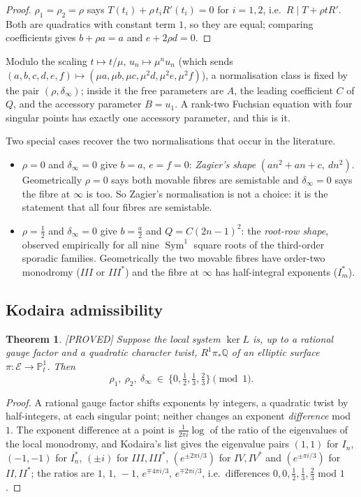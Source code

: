 \documentclass[11pt,reqno]{amsart}
\theoremstyle{plain}
\newtheorem{theorem}{Theorem}[section]
\theoremstyle{definition}
\theoremstyle{remark}
\theoremstyle{plain}
\newcommand{\Q}{\mathbb{Q}}
\newcommand{\PP}{\mathbb{P}}
\DeclareMathOperator{\Sym}{Sym}
\newcommand{\Proved}{\textup{\textsf{[PROVED]}}}
\begin{document}
\begin{proof}
$\rho_1=\rho_2=\rho$ says $T(t_i)+\rho\,t_iR'(t_i)=0$ for $i=1,2$, i.e.\
$R\mid T+\rho tR'$. Both are quadratics with constant term $1$, so they are
equal; comparing coefficients gives $b+\rho a=a$ and $e+2\rho d=0$.
\end{proof}

Modulo the scaling $t\mapsto t/\mu$, $u_n\mapsto\mu^nu_n$ (which sends
$(a,b,c,d,e,f)\mapsto(\mu a,\mu b,\mu c,\mu^2d,\mu^2e,\mu^2f)$), a normalisation
class is fixed by the pair $(\rho,\delta_\infty)$; inside it the free parameters
are $A$, the leading coefficient $C$ of $Q$, and the accessory parameter
$B=u_1$. A rank-two Fuchsian equation with four singular points has exactly one
accessory parameter, and this is it.

Two special cases recover the two normalisations that occur in the literature.

\begin{itemize}[leftmargin=1.6em]
\item $\rho=0$ and $\delta_\infty=0$ give $b=a$, $e=f=0$: \emph{Zagier's shape}
$(an^2+an+c,\ dn^2)$. Geometrically $\rho=0$ says both movable fibres are
semistable and $\delta_\infty=0$ says the fibre at $\infty$ is too. So Zagier's
normalisation is not a choice: it is the statement that all four fibres are
semistable.
\item $\rho=\tfrac12$ and $\delta_\infty=0$ give $b=\tfrac a2$ and
$Q=C(2n-1)^2$: the \emph{root-row shape}, observed empirically for all nine
$\Sym^1$ square roots of the third-order sporadic families. Geometrically the two
movable fibres have order-two monodromy ($III$ or $III^*$) and the fibre at
$\infty$ has half-integral exponents ($I_m^*$).
\end{itemize}

\subsection{Kodaira admissibility}

\begin{theorem}\label{thm:kodaira}
\Proved{} Suppose the local system $\ker L$ is, up to a rational gauge factor and
a quadratic character twist, $R^1\pi_*\Q$ of an elliptic surface
$\pi:\mathcal E\to\PP^1_t$. Then
\[
\rho_1,\ \rho_2,\ \delta_\infty\ \in\ \{0,\tfrac12,\tfrac13,\tfrac23\}\pmod 1 .
\]
\end{theorem}

\begin{proof}
A rational gauge factor shifts exponents by integers, a quadratic twist by
half-integers, at each singular point; neither changes an exponent
\emph{difference} mod $1$. The exponent difference at a point is
$\tfrac1{2\pi i}\log$ of the ratio of the eigenvalues of the local monodromy, and
Kodaira's list \cite{Kodaira1963} gives the eigenvalue pairs $(1,1)$ for $I_n$,
$(-1,-1)$ for $I_n^*$, $(\pm i)$ for $III,III^*$, $(e^{\pm2\pi i/3})$ for
$IV,IV^*$ and $(e^{\pm\pi i/3})$ for $II,II^*$; the ratios are
$1,\,1,\,-1,\,e^{\mp4\pi i/3},\,e^{\mp2\pi i/3}$, i.e.\ differences
$0,0,\tfrac12,\tfrac13,\tfrac23$ mod $1$.
\end{proof}
\end{document}
